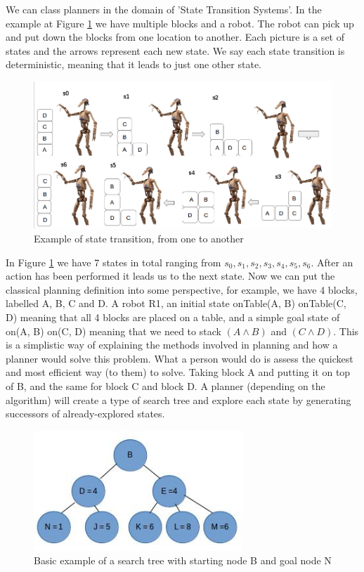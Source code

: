 We can class planners in the domain of 'State Transition Systems'. In the example at Figure \ref{fig:StateTransition} we have multiple blocks and a robot. The robot can pick up and put down the blocks from one location to another. Each picture is a set of states and the arrows represent each new state. We say each state transition is deterministic, meaning that it leads to just one other state. 
\begin{figure}[!htb]
    \centering
    \includegraphics[scale=0.3]{StateTransitionEdit.png}
    \caption{Example of state transition, from one to another}
    \label{fig:StateTransition}
\end{figure}
In Figure \ref{fig:StateTransition} we have 7 states in total ranging from $s_0, s_1, s_2, s_3, s_4, s_5, s_6$. After an action has been performed it leads us to the next state. Now we can put the classical planning definition into some perspective, for example, we have 4 blocks, labelled A, B, C and D. A robot R1, an initial state onTable(A, B) onTable(C, D) meaning that all 4 blocks are placed on a table, and a simple goal state of on(A, B) on(C, D) meaning that we need to stack $(A\wedge B)$ and $(C\wedge D)$. This is a simplistic way of explaining the methods involved in planning and how a planner would solve this problem. What a person would do is assess the quickest and most efficient way (to them) to solve. Taking block A and putting it on top of B, and the same for block C and block D. A planner (depending on the algorithm) will create a type of search tree and explore each state by generating successors of already-explored states.
\begin{figure}[!htb]
    \centering
    \includegraphics[scale=2.0,width=0.70\textwidth]{TreeExample.jpg}
    \caption{Basic example of a search tree with starting node B and goal node N\cite{PlanningBook}}
    \label{fig:Tree Example}
\end{figure}

